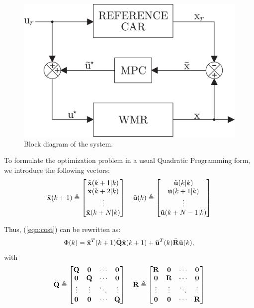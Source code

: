 \documentclass[conference]{IEEEtran} %
\begin{document}
\begin{figure}[b]
	\centering
	\includegraphics[width=.84\linewidth]{Figures/bloco.eps}
	\caption{Block diagram of the system.}
	\label{fig:bloco}
\end{figure}

To formulate the optimization problem in a usual Quadratic Programming form, we introduce the
following vectors:
\begin{equation*}
	\bar{\bf x}(k+1) \triangleq \begin{bmatrix}
		\tilde{\bf x}(k+1|k) \\ \tilde{\bf x}(k+2|k) \\ \vdots \\ \tilde{\bf x}(k+N|k) 
	\end{bmatrix} \quad
	\bar{\bf u}(k) \triangleq \begin{bmatrix}
		\tilde{\bf u}(k|k)  \\ \tilde{\bf u}(k+1|k) \\ \vdots \\ \tilde{\bf u}(k+N-1|k)
	\end{bmatrix}
\end{equation*}

Thus, (\ref{eqn:cost}) can be rewritten as:
\begin{equation}\label{eqn:cost2}
	\Phi(k) = \bar{\bf x}^T(k+1)\bar{\bf Q}\bar{\bf x}(k+1) + \bar{\bf u}^T(k)\bar{\bf R}\bar{\bf u}(k),
\end{equation}
with
\begin{equation*}
	\bar {\bf Q} \triangleq \begin{bmatrix}
		{\bf Q} & {\bf 0} & \cdots & {\bf 0} \\
		{\bf 0} & {\bf Q} & \cdots & {\bf 0} \\
		\vdots  & \vdots  & \ddots & \vdots  \\
		{\bf 0} & {\bf 0} & \cdots & {\bf Q}
	\end{bmatrix} \quad
	\bar {\bf R} \triangleq \begin{bmatrix}
		{\bf R} & {\bf 0} & \cdots & {\bf 0} \\
		{\bf 0} & {\bf R} & \cdots & {\bf 0} \\
		\vdots  & \vdots  & \ddots & \vdots  \\
		{\bf 0} & {\bf 0} & \cdots & {\bf R}
	\end{bmatrix}
\end{equation*}
\end{document}
